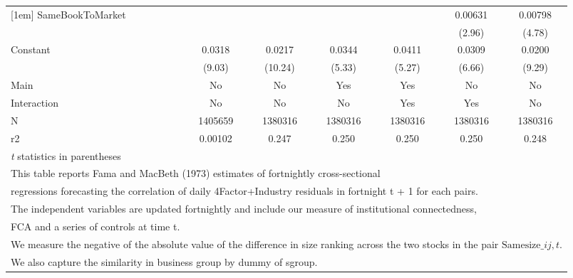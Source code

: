 {\begin{tabular}{l*{6}{c}}
[1em]
SameBookToMarket    &                     &                     &                     &                     &     0.00631\sym{**} &     0.00798\sym{***}\\
                    &                     &                     &                     &                     &      (2.96)         &      (4.78)         \\
[1em]
Constant            &      0.0318\sym{***}&      0.0217\sym{***}&      0.0344\sym{***}&      0.0411\sym{***}&      0.0309\sym{***}&      0.0200\sym{***}\\
                    &      (9.03)         &     (10.24)         &      (5.33)         &      (5.27)         &      (6.66)         &      (9.29)         \\
\hline
Main                &          No         &          No         &         Yes         &         Yes         &          No         &          No         \\
Interaction         &          No         &          No         &          No         &         Yes         &         Yes         &          No         \\
N                   &     1405659         &     1380316         &     1380316         &     1380316         &     1380316         &     1380316         \\
r2                  &     0.00102         &       0.247         &       0.250         &       0.250         &       0.250         &       0.248         \\
\hline\hline
\multicolumn{7}{l}{\footnotesize \textit{t} statistics in parentheses}\\
\multicolumn{7}{l}{\footnotesize This table reports Fama and MacBeth (1973) estimates of fortnightly cross-sectional}\\
\multicolumn{7}{l}{\footnotesize  regressions forecasting the correlation of daily 4Factor+Industry residuals in fortnight t + 1 for each pairs.}\\
\multicolumn{7}{l}{\footnotesize The independent variables are updated fortnightly and include our measure of institutional connectedness,}\\
\multicolumn{7}{l}{\footnotesize  FCA and a series of controls at time t.}\\
\multicolumn{7}{l}{\footnotesize We measure the negative of the absolute value of the difference in size ranking across the two stocks in the pair $ \text{Samesize}\_{ij,t} $.}\\
\multicolumn{7}{l}{\footnotesize We also capture the similarity in business group by dummy of sgroup.}\\

\end{tabular}}
